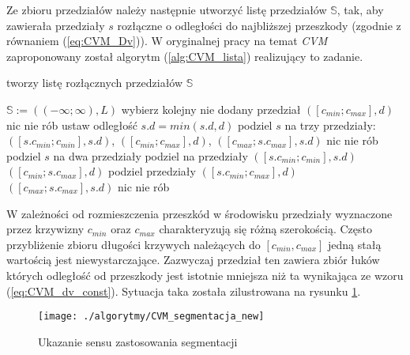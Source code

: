 	Ze zbioru przedziałów należy następnie utworzyć listę przedziałów $\mathbb{S}$, tak, aby zawierała
	przedziały $s$ rozłączne o odległości do najbliższej przeszkody (zgodnie z równaniem (\ref{eq:CVM_Dv})).
	W oryginalnej pracy na temat \textit{CVM} \cite{CVM_2} zaproponowany został algorytm (\ref{alg:CVM_lista}) realizujący to zadanie.

	\begin{algorithm}
	\caption{tworzy listę rozłącznych przedziałów $\mathbb{S}$}
	\label{alg:CVM_lista}
	\begin{algorithmic}
	\STATE $ \mathbb{S}:= ((-\infty;\infty),L) $
	\STATE  wybierz kolejny nie dodany przedział $([c_{min};c_{max}],d)$
	\STATE nic nie rób
	\STATE ustaw odległość $s.d= min(s.d,d) $
		\STATE podziel $s$ na trzy przedziały: \\$([s.c_{min};c_{min}],s.d)$, $([c_{min};c_{max}],d)$, $([c_{max};s.c_{max}],s.d)$ 
		\ELSE
		\STATE nic nie rób
		\ENDIF
		\STATE podziel $s$ na dwa przedziały
			\STATE podziel na przedziały $([s.c_{min};c_{min}],s.d)$ $([c_{min};s.c_{max}],d)$
			\ELSE
			\STATE podziel przedziały $([s.c_{min};c_{max}],d)$ $([c_{max};s.c_{max}],s.d)$
			\ENDIF
		\ELSE
		\STATE nic nie rób
		\ENDIF
	\ENDIF
	\ENDFOR
	\end{algorithmic}
	\end{algorithm}

	W zależności od rozmieszczenia przeszkód w środowisku przedziały wyznaczone przez krzywizny $c_{min}$ oraz $c_{max}$ charakteryzują się różną szerokością. Często przybliżenie zbioru długości krzywych należących do
	$[c_{min},c_{max}]$ jedną stałą wartością jest niewystarczające. Zazwyczaj przedział ten zawiera zbiór łuków których odległość od przeszkody jest istotnie mniejsza niż ta wynikająca ze wzoru (\ref{eq:CVM_dv_const}). Sytuacja taka została zilustrowana na rysunku \ref{fig:CVM_segmentacja}.
	\begin{figure}[!t]
	\centering
	\texttt{[image: ./algorytmy/CVM\_segmentacja\_new]}
	\caption{ Ukazanie sensu zastosowania segmentacji} \label{fig:CVM_segmentacja}
	\end{figure}

